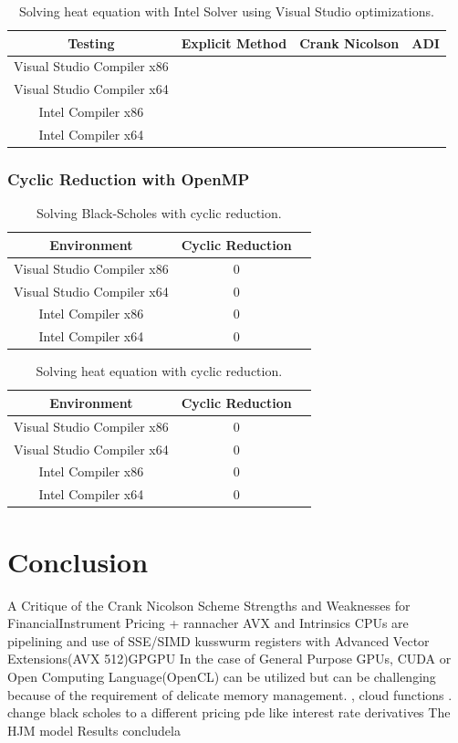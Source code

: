 \documentclass[12pt, oneside]{book}
\theoremstyle{plain}
\theoremstyle{definition}
\begin{document}
 
\begin{table}[htp!]
\centering
 \begin{tabular}{||c c c c||} 
 \hline
 Testing & Explicit Method & Crank Nicolson & ADI\\ [0.5ex] 
 \hline\hline\hline
 Visual Studio Compiler x86 \\ 
 Visual Studio Compiler x64 & \\
 Intel Compiler x86 & \\
 Intel Compiler x64 & \\[1ex] 
 \hline
 \end{tabular}
 \caption{Solving heat equation with Intel Solver using Visual Studio optimizations.}
\end{table}

\subsection{Cyclic Reduction with OpenMP} 
 
\begin{table}[h!]
\centering
 \begin{tabular}{||c c c||} 
 \hline
 Environment & Cyclic Reduction\\ [0.5ex] 
 \hline\hline\hline
 Visual Studio Compiler x86 & 0\\ 
 Visual Studio Compiler x64 & 0 \\
 Intel Compiler x86 & 0\\
 Intel Compiler x64 &0 \\ [1ex] 
 \hline
 \end{tabular}
 \caption{Solving Black-Scholes with cyclic reduction.}
\end{table}

\begin{table}[h!]
\centering
 \begin{tabular}{||c c c||} 
 \hline
 Environment & Cyclic Reduction\\ [0.5ex] 
 \hline\hline\hline
 Visual Studio Compiler x86 & 0\\ 
 Visual Studio Compiler x64 & 0 \\
 Intel Compiler x86 & 0\\
 Intel Compiler x64 &0 \\ [1ex] 
 \hline
 \end{tabular}
 \caption{Solving heat equation with cyclic reduction.}
\end{table}

\chapter{Conclusion}
A Critique of the Crank Nicolson Scheme Strengths and Weaknesses for FinancialInstrument Pricing + rannacher 
AVX and Intrinsics CPUs are pipelining and use of SSE/SIMD kusswurm registers with Advanced Vector Extensions(AVX 512)GPGPU In the case of General Purpose GPUs, CUDA or Open Computing Language(OpenCL) can be utilized but can be challenging because of the requirement of delicate memory management. \cite{fpga},  cloud functions \cite{cloudfunc}.
change black scholes to a different pricing pde like interest rate derivatives The HJM model \cite{kohl}
Results concludela
\end{document}

